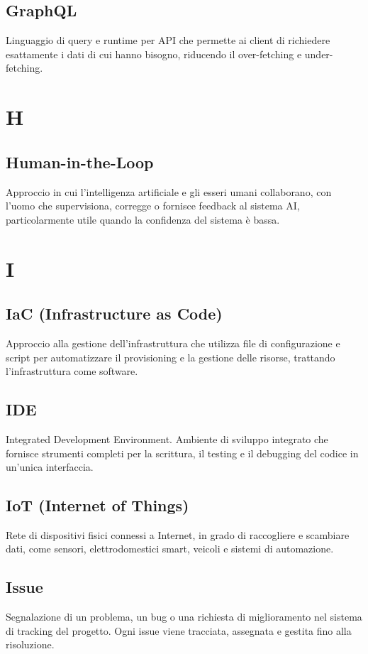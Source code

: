 \documentclass[a4paper,11pt]{article}
\begin{document}
\subsection{GraphQL}
Linguaggio di query e runtime per API che permette ai client di richiedere esattamente i dati di cui hanno bisogno, riducendo il over-fetching e under-fetching.

\newpage
\section{H}

\subsection{Human-in-the-Loop}
Approccio in cui l'intelligenza artificiale e gli esseri umani collaborano, con l'uomo che supervisiona, corregge o fornisce feedback al sistema AI, particolarmente utile quando la confidenza del sistema è bassa.

\newpage
\section{I}

\subsection{IaC (Infrastructure as Code)}
Approccio alla gestione dell'infrastruttura che utilizza file di configurazione e script per automatizzare il provisioning e la gestione delle risorse, trattando l'infrastruttura come software.

\subsection{IDE}
Integrated Development Environment. Ambiente di sviluppo integrato che fornisce strumenti completi per la scrittura, il testing e il debugging del codice in un'unica interfaccia.

\subsection{IoT (Internet of Things)}
Rete di dispositivi fisici connessi a Internet, in grado di raccogliere e scambiare dati, come sensori, elettrodomestici smart, veicoli e sistemi di automazione.

\subsection{Issue}
Segnalazione di un problema, un bug o una richiesta di miglioramento nel sistema di tracking del progetto. Ogni issue viene tracciata, assegnata e gestita fino alla risoluzione.
\end{document}

